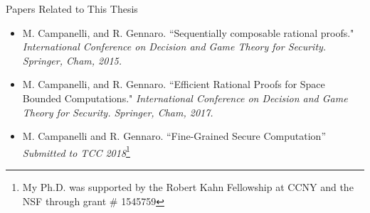 \begin{frame}{Papers Related to This Thesis}
\begin{itemize}
	\item M. Campanelli, and R. Gennaro. ``Sequentially composable rational proofs." \textit{International Conference on Decision and Game Theory for Security. Springer, Cham, 2015.}
	\item M. Campanelli, and R. Gennaro. ``Efficient Rational Proofs for Space Bounded Computations." \textit{International Conference on Decision and Game Theory for Security. Springer, Cham, 2017.}
	\item M. Campanelli and R. Gennaro. ``Fine-Grained Secure Computation'' \textit{Submitted to TCC 2018}\footnote{My Ph.D. was supported by the Robert Kahn Fellowship at CCNY and the NSF through grant \# 1545759}
\end{itemize}
\end{frame}



